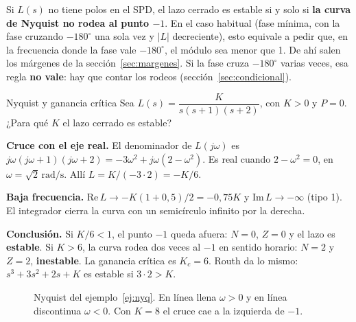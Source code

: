 \documentclass[11pt,a4paper]{article}
\newcounter{ejemplo}
\newenvironment{ejemplo}[1]{\refstepcounter{ejemplo}\begin{ejemplobox}{#1}}{\end{ejemplobox}}
\newcommand{\rads}{\,\mathrm{rad/s}}
\newcommand{\jw}{j\omega}
\begin{document}
\begin{idea}[Caso más común: lazo abierto estable ($P=0$)]
Si $L(s)$ no tiene polos en el SPD, el lazo cerrado es estable si y solo si \textbf{la curva de Nyquist no rodea al punto $-1$}.
En el caso habitual (fase mínima, con la fase cruzando $-180^\circ$ una sola vez y $|L|$ decreciente), esto equivale a pedir que,
en la frecuencia donde la fase vale $-180^\circ$, el módulo sea menor que 1. De ahí salen los márgenes de la sección~\ref{sec:margenes}.
Si la fase cruza $-180^\circ$ varias veces, esa regla \textbf{no vale}: hay que contar los rodeos (sección~\ref{sec:condicional}).
\end{idea}

\begin{ejemplo}{Nyquist y ganancia crítica}
\label{ej:nyq}
Sea $L(s)=\dfrac{K}{s(s+1)(s+2)}$, con $K>0$ y $P=0$. ¿Para qué $K$ el lazo cerrado es estable?

\textbf{Cruce con el eje real.} El denominador de $L(\jw)$ es $\jw(\jw+1)(\jw+2)=-3\omega^2+j\omega(2-\omega^2)$.
Es real cuando $2-\omega^2=0$, en $\omega=\sqrt2\rads$. Allí $L=K/(-3\cdot2)=-K/6$.

\textbf{Baja frecuencia.} $\mathrm{Re}\,L\to-K(1+0{,}5)/2=-0{,}75K$ y $\mathrm{Im}\,L\to-\infty$ (tipo 1). El integrador cierra
la curva con un semicírculo infinito por la derecha.

\textbf{Conclusión.} Si $K/6<1$, el punto $-1$ queda afuera: $N=0$, $Z=0$ y el lazo es \textbf{estable}.
Si $K>6$, la curva rodea dos veces al $-1$ en sentido horario: $N=2$ y $Z=2$, \textbf{inestable}.
La ganancia crítica es $K_c=6$. Routh da lo mismo: $s^3+3s^2+2s+K$ es estable si $3\cdot2>K$.
\end{ejemplo}

\begin{figure}[ht]
\centering
{}
\caption{Nyquist del ejemplo~\ref{ej:nyq}. En línea llena $\omega>0$ y en línea discontinua $\omega<0$. Con $K=8$ el cruce cae a la izquierda de $-1$.}
\label{fig:nyq}
\end{figure}
\end{document}
